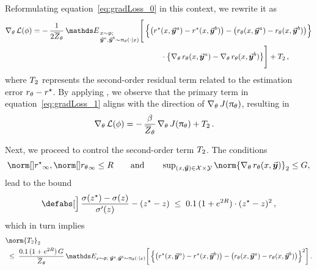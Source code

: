 	Reformulating equation~\eqref{eq:gradLoss_0} in this context, we rewrite it as
    \begin{align}
		\gradtheta \Loss(\paraphi) 
		& = - \, \frac{1}{2 \Partitionthetabar} \, \Exp_{\, \begin{subarray}{l} \\ \prompt \sim \promptdistr; \\ \responseone, \responsetwo \sim \policytheta(\cdot \mid \prompt) \end{subarray}}
		\Bigg[ \, \Big\{ \big( \rewardstar(\context, \responseone) - \rewardstar(\context, \responsetwo) \big) - \big( \rewardtheta(\context, \responseone) - \rewardtheta(\context, \responsetwo) \big) \Big\} \notag  \\
		& \qquad \qquad \qquad \qquad \qquad \qquad \qquad \qquad \quad \cdot \big\{ \gradtheta \rewardtheta(\prompt, \responseone) - \gradtheta \rewardtheta(\prompt, \responsetwo) \big\} \Bigg]
		+ \Term_2 \, , \label{eq:gradLoss_1}
	\end{align}
	where $T_2$ represents the second-order residual term related to the estimation error $r_{\theta} - r^{\star}$.
	By applying , we observe that the primary term in equation~\eqref{eq:gradLoss_1} aligns with the direction of $\nabla_{\theta} \,  J(\uppi_{\theta})$, resulting in
	\begin{align}
		\label{eq:gradLoss_final}
		\nabla_{\theta} \,  \mathcal{L}(\phi) 
		& = - \, \frac{\beta}{\overline{Z}_{\theta}} \, \nabla_{\theta} \,  J(\uppi_{\theta})
		+ T_2 \, .
	\end{align}

	
	Next, we proceed to control the second-order term $T_2$.
	The conditions
	\begin{align*}
		\supnorm{\rewardstar}, \supnorm{\rewardtheta} \leq \Radius
		\qquad \mbox{and} \qquad \sup\nolimits_{(\prompt, \response) \in \PromptSp \times \ResponseSp} \norm{\gradtheta \rewardtheta (\prompt, \response)}_2 \leq \RadiusGrad,
	\end{align*}
	lead to the bound
	\begin{align*}
		\abs[\Big]{ \, \frac{\sigmoid(z^{\star}) - \sigmoid(z)}{\divsigmoid(z)} - (z^{\star} - z) }
		\; \leq \;  0.1 \, (1 + e^{2\Radius}) \cdot (z^{\star} - z)^2 \, ,
	\end{align*}
	which in turn implies
	\begin{align}
		& \norm{\Term_2}_2
        \notag \\
        \label{eq:gradLoss_Term2}
        & \; \leq \;  \frac{0.1 \, (1 + e^{2\Radius}) \, \RadiusGrad}{\Partitionthetabar} \, \Exp_{\prompt \sim \promptdistr; \; \responseone, \responsetwo \sim \policytheta(\cdot \mid \prompt)} 
        \bigg[ \, \Big\{ \big( \rewardstar(\context, \responseone) - \rewardstar(\context, \responsetwo) \big) - \big( \rewardtheta(\context, \responseone) - \rewardtheta(\context, \responsetwo) \big) \Big\}^2 \bigg] \, .
	\end{align}
	
